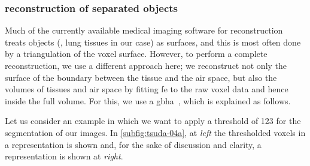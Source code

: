\subsubsection{\threed reconstruction of separated objects}
Much of the currently available medical imaging software for \threed reconstruction treats objects (\ie, lung tissues in our case) as surfaces, and this is most often done by a triangulation of the voxel surface. However, to perform a complete \threed reconstruction, we use a different approach here; we reconstruct not only the surface of the boundary between the tissue and the air space, but also the volumes of tissues and air space by fitting \ac{fe} to the raw voxel data and hence inside the full volume. For this, we use a \ac{gbha}~\cite{Schneiders1996}, which is explained as follows.

Let us consider an example in which we want to apply a threshold of 123 for the segmentation of our images. In \autoref{subfig:tsuda-04a}, at \emph{left} the thresholded voxels in a \threed representation is shown and, for the sake of discussion and clarity, a \twod representation is shown at \emph{right}.
